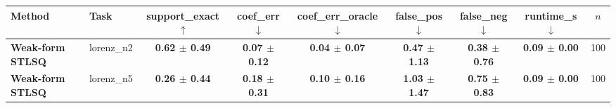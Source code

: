 \begin{tabular}{llccccccc}
\toprule
Method & Task & support\_exact $\uparrow$ & coef\_err $\downarrow$ & coef\_err\_oracle $\downarrow$ & false\_pos $\downarrow$ & false\_neg $\downarrow$ & runtime\_s $\downarrow$ & $n$ \\
\midrule
\textbf{Weak-form STLSQ} & lorenz\_n2 & \textbf{0.62 $\pm$ 0.49} & \textbf{0.07 $\pm$ 0.12} & \textbf{0.04 $\pm$ 0.07} & \textbf{0.47 $\pm$ 1.13} & \textbf{0.38 $\pm$ 0.76} & \textbf{0.09 $\pm$ 0.00} & 100 \\
\midrule
\textbf{Weak-form STLSQ} & lorenz\_n5 & \textbf{0.26 $\pm$ 0.44} & \textbf{0.18 $\pm$ 0.31} & \textbf{0.10 $\pm$ 0.16} & \textbf{1.03 $\pm$ 1.47} & \textbf{0.75 $\pm$ 0.83} & \textbf{0.09 $\pm$ 0.00} & 100 \\
\bottomrule
\end{tabular}

